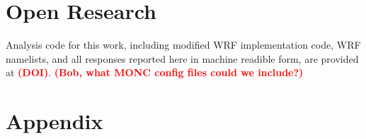 \documentclass[draft]{agujournal2019}
\newcommand{\todo}[1]{\textcolor{red}{\textbf{(#1)}}}
\begin{document}
\section{Open Research}

Analysis code for this work, including modified WRF implementation code, WRF namelists, and all responses reported here in machine readible form, are provided at \todo{DOI}. \todo{Bob, what MONC config files could we include?}



%



\newpage
\section*{Appendix}
\setcounter{figure}{0}
\renewcommand{\thefigure}{A\arabic{figure}}
\end{document}
